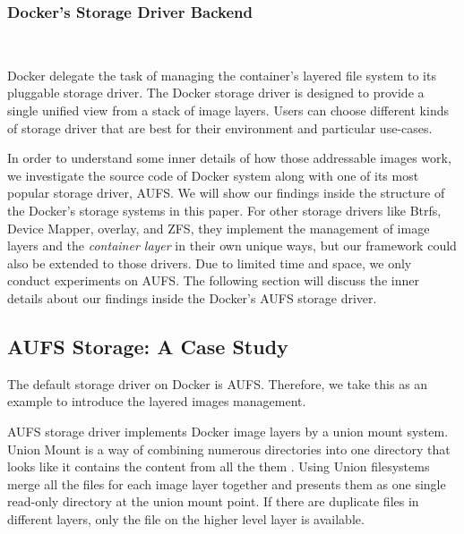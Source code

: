\smallbreak
\subsubsection{Docker's Storage Driver Backend}
~\smallbreak

Docker delegate the task of managing the container's layered file system to its pluggable storage driver. 
The Docker storage driver is designed to provide a single unified view from a stack of image layers.
Users can choose different kinds of storage driver that are best for their environment and particular use-cases. 

In order to understand some inner details of how those addressable images work, we investigate the source code of Docker system along with one of its most popular storage driver, AUFS. We will show our findings inside the structure of the Docker's storage systems in this paper. For other storage drivers like Btrfs, Device Mapper, overlay, and ZFS, they implement the management of image layers and the \textit{container layer} in their own unique ways, but our framework could also be extended to those drivers. Due to limited time and space, we only conduct experiments on AUFS. The following section will discuss the inner details about our findings inside the Docker's AUFS storage driver.



\subsection{AUFS Storage: A Case Study}
The default storage driver on Docker is AUFS. Therefore, we take this as an example to introduce the layered images management.

AUFS storage driver implements Docker image layers by a union mount system. Union Mount is a way of combining numerous directories into one directory that looks like it contains the content from all the them \cite{aufs}. Using Union filesystems merge all the files for each image layer together and presents them as one single read-only directory at the union mount point. If there are duplicate files in different layers, only the file on the higher level layer is available.

